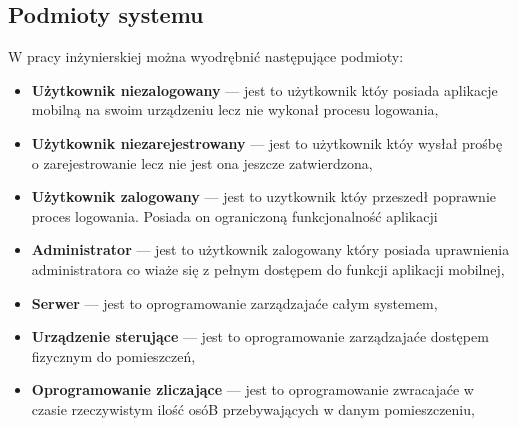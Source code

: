 \newpage
\subsection{Podmioty systemu} 
W pracy inżynierskiej można wyodrębnić następujące podmioty:
	\begin{itemize}
	\item \textbf{Użytkownik niezalogowany} --- jest to użytkownik któy posiada aplikacje mobilną na swoim urządzeniu lecz nie wykonał procesu logowania,
	\item \textbf{Użytkownik niezarejestrowany} --- jest to użytkownik któy wysłał prośbę o zarejestrowanie lecz nie jest ona jeszcze zatwierdzona,
	\item \textbf{Użytkownik zalogowany} --- jest to uzytkownik któy przeszedł poprawnie proces logowania. Posiada on ograniczoną funkcjonalność aplikacji
	\item \textbf{Administrator} --- jest to użytkownik zalogowany który posiada uprawnienia administratora co wiaże się z pełnym dostępem do funkcji aplikacji mobilnej,
	\item \textbf{Serwer} --- jest to oprogramowanie zarządzajaće całym systemem,
	\item \textbf{Urządzenie sterujące} --- jest to oprogramowanie zarządzajaće dostępem fizycznym do pomieszczeń,
	\item \textbf{Oprogramowanie zliczające} --- jest to oprogramowanie zwracajaće w czasie rzeczywistym ilość osóB przebywających w danym pomieszczeniu,
\end{itemize}